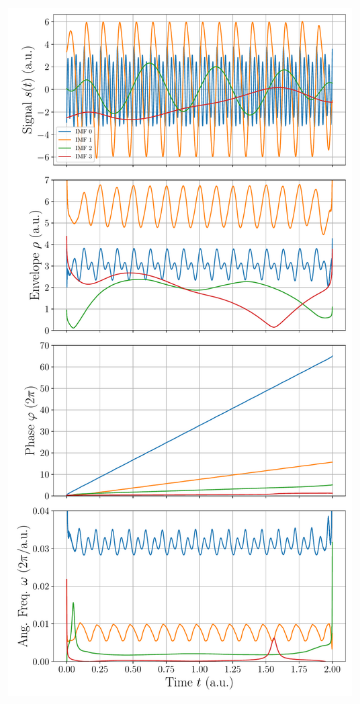 \documentclass[a4paper,DIV=12,english]{scrartcl}
\begin{document}
\begin{figure}
\begin{subfigure}{0.49\textwidth}
        \caption{}
        \label{subfig:imf}
    \end{subfigure}
    \begin{subfigure}{0.49\textwidth}
        \centering
        \includegraphics[width=\textwidth]{../imf_analytic_sig.pdf}
        \caption{}
        \label{subfig:as}
    \end{subfigure}
    \caption{}
    \label{fig:imf}
\end{figure}
\end{document}
